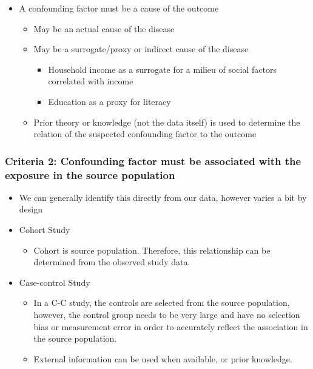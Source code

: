 \documentclass[
]{book}
\providecommand{\tightlist}{%
  \setlength{\itemsep}{0pt}\setlength{\parskip}{0pt}}
\begin{document}
\begin{itemize}
\tightlist
\item
  A confounding factor must be a cause of the outcome

  \begin{itemize}
  \tightlist
  \item
    May be an actual cause of the disease
  \item
    May be a surrogate/proxy or indirect cause of the disease

    \begin{itemize}
    \tightlist
    \item
      Household income as a surrogate for a milieu of social factors correlated with income
    \item
      Education as a proxy for literacy
    \end{itemize}
  \item
    Prior theory or knowledge (not the data itself) is used to determine the relation of the suspected confounding factor to the outcome
  \end{itemize}
\end{itemize}

\hypertarget{criteria-2-confounding-factor-must-be-associated-with-the-exposure-in-the-source-population}{%
\subsubsection{Criteria 2: Confounding factor must be associated with the exposure in the source population}\label{criteria-2-confounding-factor-must-be-associated-with-the-exposure-in-the-source-population}}

\begin{itemize}
\tightlist
\item
  We can generally identify this directly from our data, however varies a bit by design
\item
  Cohort Study

  \begin{itemize}
  \tightlist
  \item
    Cohort is source population. Therefore, this relationship can be determined from the observed study data.
  \end{itemize}
\item
  Case-control Study

  \begin{itemize}
  \tightlist
  \item
    In a C-C study, the controls are selected from the source population, however, the control group needs to be very large and have no selection bias or measurement error in order to accurately reflect the association in the source population.
  \item
    External information can be used when available, or prior knowledge.
  \end{itemize}
\end{itemize}
\end{document}
